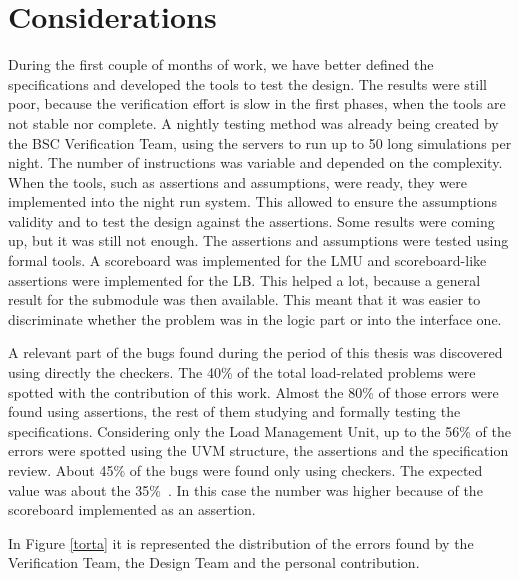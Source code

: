 \section{Considerations}
During the first couple of months of work, we have better defined the specifications and developed the tools to test the design.
The results were still poor, because the verification effort is slow in the first phases, when the tools are not stable nor complete.
A nightly testing method was already being created by the BSC Verification Team, using the servers to run up to 50 long simulations per night. The number of instructions was variable and depended on the complexity.
When the tools, such as assertions and assumptions, were ready, they were implemented into the night run system.
This allowed to ensure the assumptions validity and to test the design against the assertions.
Some results were coming up, but it was still not enough. 
The assertions and assumptions were tested using formal tools. A scoreboard was implemented for the LMU and scoreboard-like assertions were implemented for the LB. This helped a lot, because a general result for the submodule was then available. This meant that it was easier to discriminate whether the problem was in the logic part or into the interface one.

A relevant part of the bugs found during the period of this thesis was discovered using directly the checkers. The 40\% of the total load-related problems were spotted with the contribution of this work. Almost the 80\% of those errors were found using assertions, the rest of them studying and formally testing the specifications. 
Considering only the Load Management Unit, up to the 56\% of the errors were spotted using the UVM structure, the assertions and the specification review. About 45\% of the bugs were found only using checkers. The expected value was about the 35\%~\cite{results}. In this case the number was higher because of the scoreboard implemented as an assertion.

In Figure \ref{torta} it is represented the distribution of the errors found by the Verification Team, the Design Team and the personal contribution.

